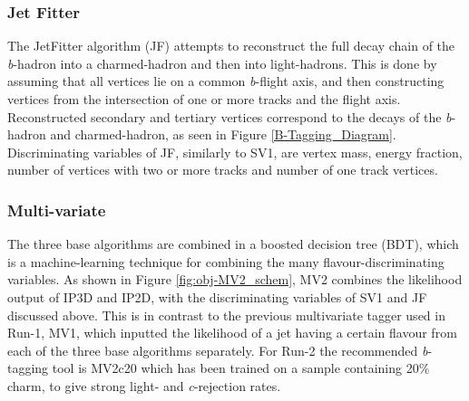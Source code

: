    \subsubsection{Jet Fitter}
   \label{sec:obj-bjets_JF}

   The JetFitter algorithm (JF) attempts to reconstruct the full decay chain of the \textit{b}-hadron into a charmed-hadron and then into light-hadrons. 
   This is done by assuming that all vertices lie on a common \textit{b}-flight axis, and then constructing vertices from the intersection of
   one or more tracks and the flight axis.
   Reconstructed secondary and tertiary vertices correspond to the decays of the \textit{b}-hadron and charmed-hadron, as seen in Figure \ref{B-Tagging_Diagram}.
   Discriminating variables of JF, similarly to SV1, are vertex mass, energy fraction, number of vertices with two or more tracks and number of one track vertices.
   
   \subsubsection{Multi-variate}
   \label{sec:obj-bjets_MV2}

   
   The three base algorithms are combined in a boosted decision tree (BDT), which is a machine-learning technique for combining the many flavour-discriminating variables.
   As shown in Figure \ref{fig:obj-MV2_schem}, MV2 combines the likelihood output of IP3D and IP2D, with the discriminating variables of SV1 and JF discussed above.
   This is in contrast to the previous multivariate tagger used in Run-1, MV1, which inputted
   the likelihood of a jet having a certain flavour from each of the three base algorithms separately.
   For Run-2 the recommended \textit{b}-tagging tool is MV2c20 which has been trained on a sample containing 20\% charm, to give strong light- and \textit{c}-rejection rates.
 
